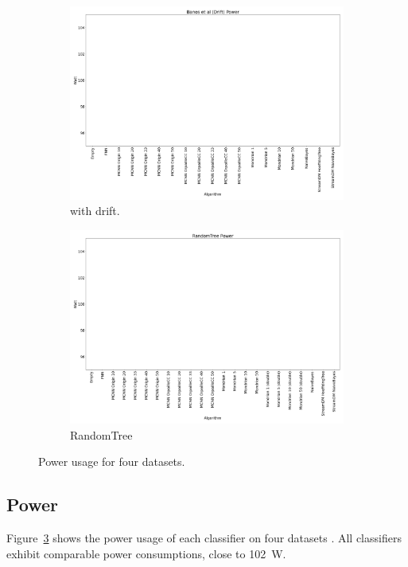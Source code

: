 \begin{figure}
\begin{subfigure}[t]{.49\linewidth}
		\includegraphics[width=\linewidth]{figures/results/drift_watt.png}
		\caption{\banosdataset with drift.}
		\label{fig:power-drift}
	\end{subfigure}
	\hfill
	\begin{subfigure}[t]{.49\linewidth}
		\includegraphics[width=\linewidth]{figures/results/dataset_3_watt.png}
		\caption{RandomTree}
		\label{fig:power-dataset_3}
	\end{subfigure}
	\caption{Power usage for four datasets.}
	\label{fig:power}
\end{figure}
\subsection{Power}
\label{sec:result-power}
Figure~\ref{fig:power} shows the power usage of each classifier on four
datasets . All classifiers exhibit comparable power consumptions, close to 102~W.



